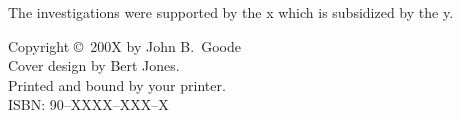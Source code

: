 {\vfill

%
\noindent%
The investigations were supported by the  x          %
which is subsidized by the y.
\par\vspace {2cm}

%

%
\noindent%
Copyright \copyright\ 200X by John B.\ Goode\\[2ex] %
Cover design by Bert Jones.\\                       %
Printed and bound by your printer.\\[2ex]           %
ISBN: 90--XXXX--XXX--X                              %


\clearpage
} %

